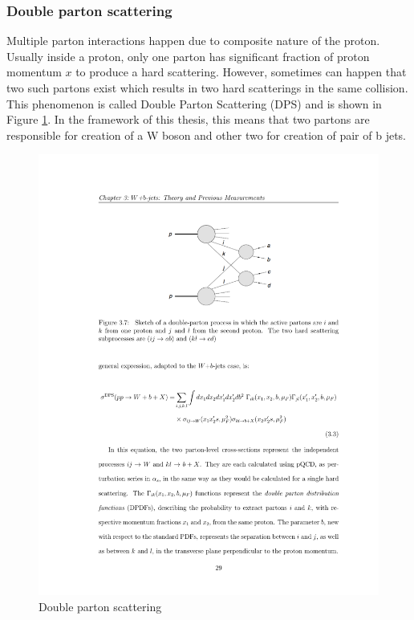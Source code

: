 \subsubsection{Double parton scattering}
\label{sec:DPS}

\par Multiple parton interactions happen due to composite nature of the proton. Usually inside a proton, only one parton has significant fraction of proton momentum $x$ to produce a hard scattering. However, sometimes can happen that two such partons exist which results in two hard scatterings in the same collision. This phenomenon is called Double Parton Scattering (DPS) and is shown in Figure \ref{fig:DPS_diag}. In the framework of this thesis, this means that two partons are responsible for creation of a W boson and other two for creation of pair of b jets. 
\begin{figure}[htbp]
	\centering
		\includegraphics{Figures/DPS_diag.pdf}
	\caption[Double parton scattering]{Double parton scattering}
	\label{fig:DPS_diag}
\end{figure}
